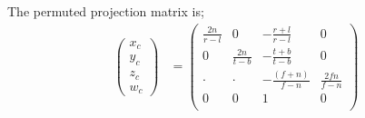 The permuted projection matrix is; 
\begin{equation}
\begin{aligned}
\begin{pmatrix} x_{c}\\y_{c}\\z_{c}\\w_{c} \end{pmatrix} &= 
\begin{pmatrix} 
\frac{2n}{r-l} & 0 & -\frac{r+l}{r-l} & 0 \\
0 & \frac{2n}{t-b} & -\frac{t+b}{t-b} & 0 \\
\cdot & \cdot & -\frac{(f+n)}{f-n} & \frac{2fn}{f-n} \\
0 & 0 & 1 & 0 \\
\end{pmatrix} \\
\end{aligned}
\end{equation}

